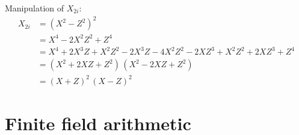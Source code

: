 \documentclass{article}
\begin{document}
Manipulation of $X_{2i}$:
\begin{align*}
X_{2i} &= (X^2 - Z^2)^2 \\
&= X^4 - 2X^2 Z^2 + Z^4 \\
&= X^4 + 2X^3 Z + X^2 Z^2 - 2X^3 Z - 4 X^2 Z^2 - 2X Z^3 + X^2 Z^2 + 2X Z^3 + Z^4 \\
&= (X^2 + 2XZ + Z^2)\,(X^2 - 2XZ + Z^2) \\
&= (X + Z)^2\,(X - Z)^2
\end{align*}

\section{Finite field arithmetic}\label{sec:field-arithmetic}



\end{document}
